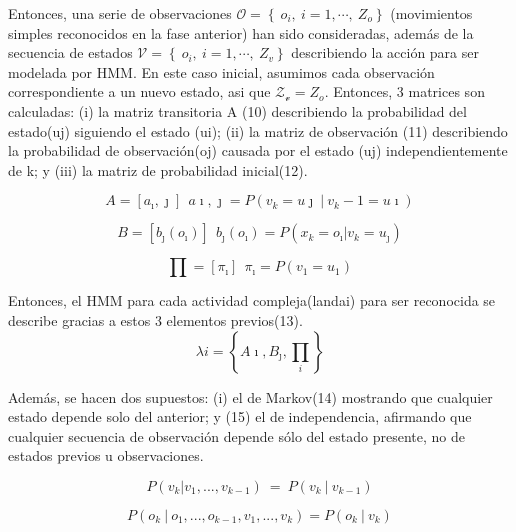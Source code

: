 \documentclass{article}
\begin{document}
Entonces, una serie de observaciones $\mathcal{O} =  \left\lbrace \ o_i,\ i=1,\cdots , \ Z_o \right\rbrace$ (movimientos simples reconocidos en la fase anterior) han sido consideradas, además de la secuencia de estados  $\mathcal{V} =  \left\lbrace \ o_i,\ i=1,\cdots , \ Z_v \right\rbrace$ describiendo la acción para ser modelada por HMM. En este caso inicial, asumimos cada observación correspondiente a un nuevo estado, asi que  $\mathcal{Z_v} =  Z_o$. Entonces, 3 matrices son calculadas: (i) la matriz transitoria A (10) describiendo la probabilidad del estado(uj) siguiendo el estado (ui); (ii) la matriz de observación (11) describiendo la probabilidad de observación(oj) causada por el estado (uj) independientemente de k; y (iii) la matriz de probabilidad inicial(12).

\begin{equation}A  =\left[a_\imath ,\jmath \right] \ \ a\imath ,\jmath = P\left(v_k = u\jmath \ | \ v_k-1 = u\imath  \right)\end{equation}

\begin{equation}B  =\left[b_\jmath \left(o_\imath \right)  \right] \ \ b_\jmath \left(o_\imath \right)  = P\left(x_k = o_\imath | v_k = u_\jmath  \right)  \end{equation}

\begin{equation}\prod =\left[\pi_\imath \right] \ \ \pi_\imath = P\left(v_1= u_1\right)  \end{equation}

Entonces, el HMM para cada actividad compleja(landai) para ser reconocida se describe gracias a estos 3 elementos previos(13).
\begin{equation}\lambda i=\left\{A\imath ,B_\jmath ,\prod_i  \right\}\end{equation}

Además, se hacen dos supuestos: (i) el de Markov(14) mostrando que cualquier estado depende solo del anterior; y (15) el de independencia, afirmando que cualquier secuencia de observación depende sólo del estado presente, no de estados previos u observaciones.


\begin{equation} P\left(v_k | v_1, ... , v_{k-1}\right) \ = \ P\left(v_k \ | \ v_{k-1}\right)  \end{equation}

\begin{equation}P\left(o_k \ | \ o_1, ..., o_{k-1}, v_1,...,v_k\right) = P\left(o_k \ | \  v_k\right)\end{equation}
\end{document}
